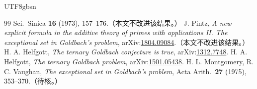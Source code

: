 \documentclass[11pt,a4paper]{article}
\theoremstyle{plain}
\theoremstyle{definition}
\begin{document}
\begin{CJK}{UTF8}{gbsn}
\begin{thebibliography}{99}
Sci.\ Sinica \textbf{16} (1973), 157--176.（本文不改进该结果。）
 J. Pintz, \emph{A new explicit formula in the additive theory of primes with applications II. The exceptional set in Goldbach's problem},
arXiv:\url{1804.09084}.（本文不改进该结果。）
 H. A. Helfgott, \emph{The ternary Goldbach conjecture is true}, arXiv:\url{1312.7748}.
 H. A. Helfgott, \emph{The ternary Goldbach problem}, arXiv:\url{1501.05438}.
 H. L. Montgomery, R. C. Vaughan, \emph{The exceptional set in Goldbach's problem}, Acta Arith.\ \textbf{27} (1975), 353--370.（待核。）
\end{thebibliography}

\end{CJK}
\end{document}
